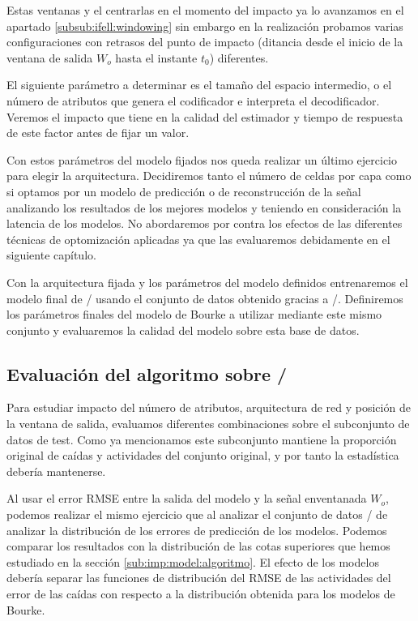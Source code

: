   Estas ventanas y el centrarlas en el momento del impacto ya lo avanzamos en el apartado \ref{subsub:ifell:windowing} sin embargo en la realización probamos varias configuraciones con retrasos del punto de impacto (ditancia desde el inicio de la ventana de salida $W_o$ hasta el instante $t_0$) diferentes. 

  El siguiente parámetro a determinar es el tamaño del espacio intermedio, o el número de atributos que genera el codificador e interpreta el decodificador. Veremos el impacto que tiene en la calidad del estimador y tiempo de respuesta de este factor antes de fijar un valor.

  Con estos parámetros del modelo fijados nos queda realizar un último ejercicio para elegir la arquitectura. Decidiremos tanto el número de celdas por capa como si optamos por un modelo de predicción o de reconstrucción de la señal analizando los resultados de los mejores modelos y teniendo en consideración la latencia de los modelos. No abordaremos por contra los efectos de las diferentes técnicas de optomización aplicadas ya que las evaluaremos debidamente en el siguiente capítulo.

  Con la arquitectura fijada y los parámetros del modelo definidos entrenaremos el modelo final de \ifell/ usando el conjunto de datos obtenido gracias a \accelcapture/. Definiremos los parámetros finales del modelo de Bourke a utilizar mediante este mismo conjunto y evaluaremos la calidad del modelo sobre esta base de datos.

\subsection{Evaluación del algoritmo sobre \ifell/}

Para estudiar impacto del número de atributos, arquitectura de red y posición de la ventana de salida, evaluamos diferentes combinaciones sobre el subconjunto de datos de test. Como ya mencionamos este subconjunto mantiene la proporción original de caídas y actividades del conjunto original, y por tanto la estadística debería mantenerse. 

Al usar el error RMSE entre la salida del modelo y la señal enventanada $W_o$, podemos realizar el mismo ejercicio que al analizar el conjunto de datos \ifell/ de analizar la distribución de los errores de predicción de los modelos. Podemos comparar los resultados con la distribución de las cotas superiores que hemos estudiado en la sección \ref{sub:imp:model:algoritmo}. El efecto de los modelos debería separar las funciones de distribución del RMSE de las actividades del error de las caídas con respecto a la distribución obtenida para los modelos de Bourke.

